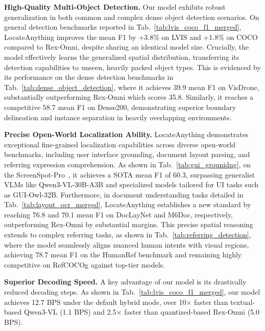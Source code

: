 \vspace{+1mm}
\noindent\textbf{High-Quality Multi-Object Detection.}
Our model exhibits robust generalization in both common and complex dense object detection scenarios. On general detection benchmarks reported in Tab.~\ref{tab:lvis_coco_f1_merged}, LocateAnything improves the mean F1 by +3.8\% on LVIS and +1.8\% on COCO compared to Rex-Omni, despite sharing an identical model size. Crucially, the model effectively learns the generalized spatial distribution, transferring its detection capabilities to unseen, heavily packed object types. This is evidenced by its performance on the dense detection benchmarks in Tab.~\ref{tab:dense_object_detection}, where it achieves 39.9 mean F1 on VisDrone, substantially outperforming Rex-Omni which scores 35.8. Similarly, it reaches a competitive 58.7 mean F1 on Dense200, demonstrating superior boundary delineation and instance separation in heavily overlapping environments.



\vspace{+1mm}
\noindent\textbf{Precise Open-World Localization Ability.}
LocateAnything demonstrates exceptional fine-grained localization capabilities across diverse open-world benchmarks, including user interface grounding, document layout parsing, and referring expression comprehension. As shown in Tab.~\ref{tab:gui_grounidng}, on the ScreenSpot-Pro~\citep{li2025screenspot}, it achieves a SOTA mean F1 of 60.3, surpassing generalist VLMs like Qwen3-VL-30B-A3B and specialized models tailored for UI tasks such as GUI-Owl-32B. Furthermore, in document understanding tasks detailed in Tab.~\ref{tab:layout_ocr_merged}, LocateAnything establishes a new standard by reaching 76.8 and 70.1 mean F1 on DocLayNet and M6Doc, respectively, outperforming Rex-Omni by substantial margins. This precise spatial reasoning extends to complex referring tasks, as shown in Tab.~\ref{tab:referring_detection}, where the model seamlessly aligns nuanced human intents with visual regions, achieving 78.7 mean F1 on the HumanRef benchmark and remaining highly competitive on RefCOCOg against top-tier models.

\vspace{+1mm}
\noindent\textbf{Superior Decoding Speed.}
A key advantage of our model is its drastically reduced decoding steps. As shown in Tab.~\ref{tab:lvis_coco_f1_merged}, our model achieves 12.7 BPS under the default hybrid mode, over 10$\times$ faster than textual-based Qwen3-VL (1.1 BPS) and 2.5$\times$ faster than quantized-based Rex-Omni (5.0 BPS).

